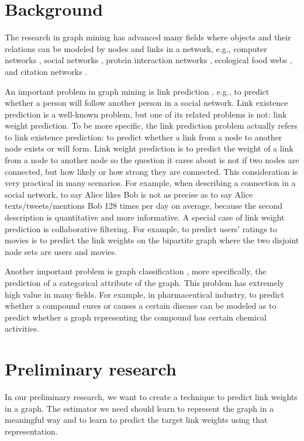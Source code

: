 \documentclass{article}
\begin{document}
\section{Background}
The research in graph mining has advanced many fields
where objects and their relations can be modeled by nodes and links in a network, e.g.,
computer networks \cite{bermond1995distributed},
social networks \cite{cook2006mining},
protein interaction networks \cite{bader2003automated},
ecological food webs \cite{brown2003ecological},
and citation networks \cite{greenberg2009citation}.

An important problem in graph mining is link prediction \cite{liben2007link},
e.g., to predict whether a person will follow another person in a social network.
Link existence prediction is a well-known problem,
but one of its related problems is not: link weight prediction.
To be more specific,
the link prediction problem actually refers to link existence prediction:
to predict whether a link from a node to another node exists or will form.
Link weight prediction is
to predict the weight of a link from a node to another node
so the question it cares about is not if two nodes are connected,
but how likely or how strong they are connected.
This consideration is very practical in many scenarios.
For example, when describing a connection in a social network,
to say Alice likes Bob is not as precise as
to say Alice texts/tweets/mentions Bob 128 times per day on average,
because the second description is quantitative and more informative.
A special case of link weight prediction is collaborative filtering.
For example, to predict users' ratings to movies
is to predict the link weights on the bipartite graph
where the two disjoint node sets are users and movies.

Another important problem is graph classification \cite{duda2012pattern},
more specifically, the prediction of a categorical attribute of the graph.
This problem has extremely high value in many fields.
For example, in pharmaceutical industry,
to predict whether a compound cures or causes a certain disease
can be modeled as to predict whether a graph representing the compound
has certain chemical activities.

\section{Preliminary research}
In our preliminary research,
we want to create a technique to predict link weights in a graph.
The estimator we need should learn to represent the graph in a meaningful way
and to learn to predict the target link weights using that representation.
\end{document}

